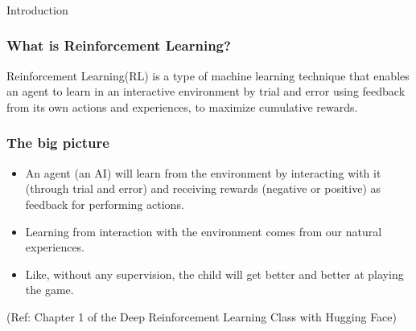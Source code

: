 \begin{frame}[fragile]\frametitle{}
\begin{center}
{\Large Introduction}
\end{center}
\end{frame}

\begin{frame}[fragile]\frametitle{What is Reinforcement Learning?}
Reinforcement Learning(RL) is a type of machine learning technique that enables an agent to learn in an interactive environment by trial and error using feedback from its own actions and experiences, to maximize cumulative rewards.


\end{frame}

\begin{frame}[fragile]\frametitle{The big picture}
\begin{itemize}
\item An agent (an AI) will learn from the environment by interacting with it (through trial and error) and receiving rewards (negative or positive) as feedback for performing actions.
\item Learning from interaction with the environment comes from our natural experiences.
\item Like, without any supervision, the child will get better and better at playing the game.
\end{itemize}

{\tiny (Ref: Chapter 1 of the Deep Reinforcement Learning Class with Hugging Face)}


\end{frame}

